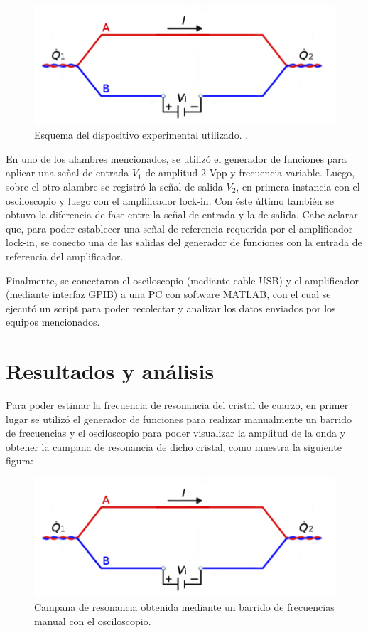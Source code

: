 \documentclass[twoside,twocolumn,a4paper]{article}
\begin{document}
\begin{figure}[H]
\includegraphics[width=\linewidth]{peltier.jpg}
\caption{Esquema del dispositivo experimental utilizado. .}
\label{fig:dispexp}
\end{figure}

En uno de los alambres mencionados, se utiliz\'o el generador de funciones para aplicar una se\~nal de entrada $V_{1}$ de amplitud 2 Vpp y frecuencia variable. Luego, sobre el otro alambre se registr\'o la se\~nal de salida $V_{2}$, en primera instancia con el osciloscopio y luego con el amplificador lock-in. Con \'este \'ultimo tambi\'en se obtuvo la diferencia de fase entre la se\~nal de entrada y la de salida. Cabe aclarar que, para poder establecer una se\~nal de referencia requerida por el amplificador lock-in, se conecto una de las salidas del generador de funciones con la entrada de referencia del amplificador.


Finalmente, se conectaron el osciloscopio (mediante cable USB) y el amplificador (mediante interfaz GPIB) a una PC con software MATLAB,    con el cual se ejecut\'o un script para poder recolectar y analizar los datos enviados por los equipos mencionados.

\section{Resultados y an\'alisis}

Para poder estimar la frecuencia de resonancia del cristal de cuarzo, en primer lugar se utiliz\'o el generador de funciones para realizar manualmente un barrido de frecuencias y el osciloscopio para poder visualizar la amplitud de la onda y obtener la campana de resonancia de dicho cristal, como muestra la siguiente figura:

\begin{figure}[H]
\includegraphics[width=\linewidth]{peltier.jpg}
\caption{Campana de resonancia obtenida mediante un barrido de frecuencias manual con el osciloscopio.}
\label{fig:detallecampanaOSC}
\end{figure}
\end{document}
